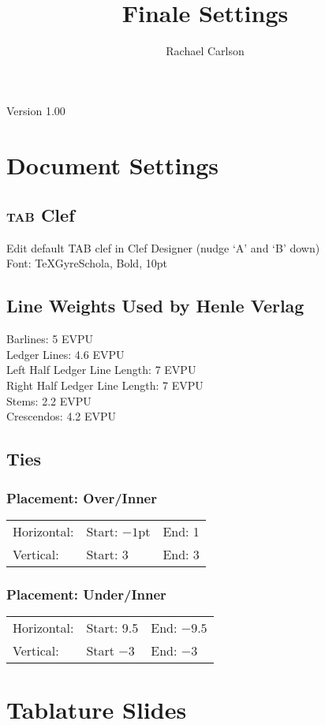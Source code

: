 \documentclass[10pt,twoside]{article} %
\title{\textsf{Finale Settings}}
\author{\textsf{Rachael Carlson}}
\begin{document}
\maketitle
\begin{center}
Version 1.00
\end{center}

\tableofcontents
\clearpage
\section{Document Settings}
 
\subsection{\textsc{tab} Clef}
Edit default TAB clef in Clef Designer (nudge `A' and 	`B' down)\\
Font: TeXGyreSchola, Bold, 10pt
\subsection{Line Weights Used by Henle Verlag}
Barlines: 5 EVPU\\
Ledger Lines: 4.6 EVPU\\
Left Half Ledger Line Length: 7 EVPU\\
Right Half Ledger Line Length: 7 EVPU\\
Stems: 2.2 EVPU\\
Crescendos: 4.2 EVPU
\subsection{Ties}
\subsubsection{Placement: Over/Inner}
\begin{tabular}{l l l}
Horizontal: & Start: $-1$pt & End: 1\\
Vertical: & Start: 3 & End: 3\\
\end{tabular}
\subsubsection{Placement: Under/Inner}
\begin{tabular}{l l l}
Horizontal: & Start: 9.5 & End: $-9.5$\\
Vertical: & Start $-3$ & End: $-3$
\end{tabular}
\section{Tablature Slides}
\end{document}
